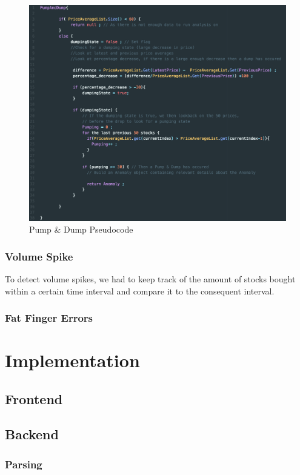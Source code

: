 \documentclass[12pt]{article}
\begin{document}
    \begin{figure}[H]
    \centering
    \includegraphics[width=150mm]{PDpseudo.png}
    \caption{Pump \& Dump Pseudocode}
    \label{2}
    \end{figure}
    \subsubsection{Volume Spike}
    To detect volume spikes, we had to keep track of the amount of stocks bought within a certain time interval and compare it to the consequent interval.
    
    \subsubsection{Fat Finger Errors}
\newpage
\section{Implementation}
  \subsection{Frontend}
  \subsection{Backend}
    \subsubsection{Parsing}
\end{document}
